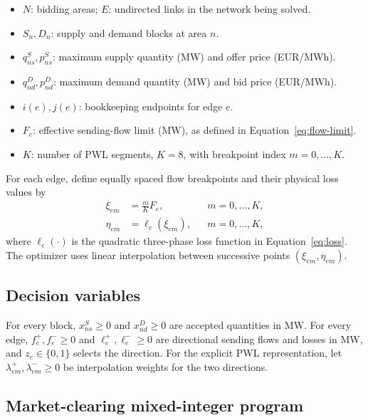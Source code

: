 \documentclass[11pt]{article}
\begin{document}
\begin{itemize}[leftmargin=*]
\item \(N\): bidding areas; \(E\): undirected links in the network being solved.
\item \(S_n,D_n\): supply and demand blocks at area \(n\).
\item \(q^S_{ns},p^S_{ns}\): maximum supply quantity (MW) and offer price
      (EUR/MWh).
\item \(q^D_{nd},p^D_{nd}\): maximum demand quantity (MW) and bid price
      (EUR/MWh).
\item \(i(e),j(e)\): bookkeeping endpoints for edge \(e\).
\item \(F_e\): effective sending-flow limit (MW), as defined in
      Equation~\ref{eq:flow-limit}.
\item \(K\): number of PWL segments, \(K=8\), with breakpoint index
      \(m=0,\ldots,K\).
\end{itemize}

For each edge, define equally spaced flow breakpoints and their physical loss
values by
\begin{align}
\xi_{em} &= \frac{m}{K}F_e,
&&m=0,\ldots,K,\\
\eta_{em} &= \ell_e(\xi_{em}),
&&m=0,\ldots,K,
\label{eq:breakpoint-values}
\end{align}
where \(\ell_e(\cdot)\) is the quadratic three-phase loss function in
Equation~\ref{eq:loss}. The optimizer uses linear interpolation between
successive points \((\xi_{em},\eta_{em})\).

\subsection{Decision variables}

For every block, \(x^S_{ns}\ge0\) and \(x^D_{nd}\ge0\) are accepted quantities
in MW. For every edge, \(f_e^+,f_e^-\ge0\) and \(\ell_e^+,\ell_e^-\ge0\)
are directional sending flows and losses in MW, and \(z_e\in\{0,1\}\)
selects the direction. For the explicit PWL representation, let
\(\lambda^+_{em},\lambda^-_{em}\ge0\) be interpolation weights for the two
directions.

\subsection{Market-clearing mixed-integer program}
\end{document}
